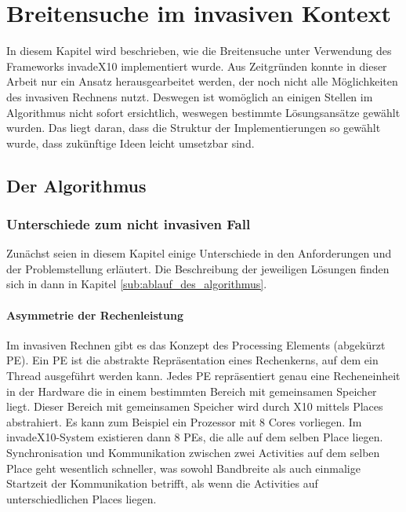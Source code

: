 
\chapter{Breitensuche im invasiven Kontext} %
\label{cha:breitensuche_im_invasiven_kontext}
In diesem Kapitel wird beschrieben, wie die Breitensuche unter Verwendung des Frameworks invadeX10 implementiert wurde. Aus Zeitgründen konnte in dieser Arbeit nur ein Ansatz herausgearbeitet werden, der noch nicht alle Möglichkeiten des invasiven Rechnens nutzt. Deswegen ist womöglich an einigen Stellen im Algorithmus nicht sofort ersichtlich, weswegen bestimmte Lösungsansätze gewählt wurden. Das liegt daran, dass die Struktur der Implementierungen so gewählt wurde, dass zukünftige Ideen leicht umsetzbar sind.

\section{Der Algorithmus} %
\label{sec:der_algorithmus}

\subsection{Unterschiede zum nicht invasiven Fall} %
\label{sub:unterschiede_zum_nicht_invasiven_fall}
Zunächst seien in diesem Kapitel einige Unterschiede in den Anforderungen und der Problemstellung erläutert. Die Beschreibung der jeweiligen Lösungen finden sich in dann in Kapitel \ref{sub:ablauf_des_algorithmus}.

\subsubsection{Asymmetrie der Rechenleistung} %
\label{ssub:asymmetrie_der_rechenleistung}
Im invasiven Rechnen gibt es das Konzept des Processing Elements (abgekürzt PE). Ein PE ist die abstrakte Repräsentation eines Rechenkerns, auf dem ein Thread ausgeführt werden kann. Jedes PE repräsentiert genau eine Recheneinheit in der Hardware die in einem bestimmten Bereich mit gemeinsamen Speicher liegt. Dieser Bereich mit gemeinsamen Speicher wird durch X10 mittels Places abstrahiert. Es kann zum Beispiel ein Prozessor mit 8 Cores vorliegen. Im invadeX10-System existieren dann 8 PEs, die alle auf dem selben Place liegen. Synchronisation und Kommunikation zwischen zwei Activities auf dem selben Place geht wesentlich schneller, was sowohl Bandbreite als auch einmalige Startzeit der Kommunikation betrifft, als wenn die Activities auf unterschiedlichen Places liegen. 

